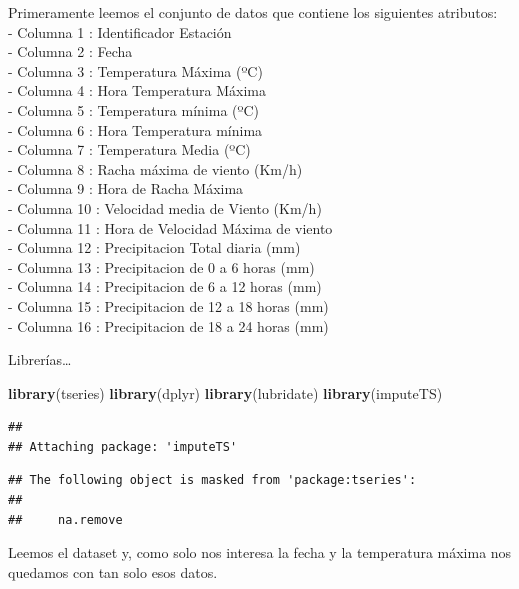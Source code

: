 \documentclass[]{article}
\newenvironment{Shaded}{\begin{snugshade}}{\end{snugshade}}
\newcommand{\KeywordTok}[1]{\textcolor[rgb]{0.13,0.29,0.53}{\textbf{#1}}}
\newcommand{\DataTypeTok}[1]{\textcolor[rgb]{0.13,0.29,0.53}{#1}}
\newcommand{\StringTok}[1]{\textcolor[rgb]{0.31,0.60,0.02}{#1}}
\newcommand{\OtherTok}[1]{\textcolor[rgb]{0.56,0.35,0.01}{#1}}
\newcommand{\OperatorTok}[1]{\textcolor[rgb]{0.81,0.36,0.00}{\textbf{#1}}}
\newcommand{\NormalTok}[1]{#1}
\begin{document}
Primeramente leemos el conjunto de datos que contiene los siguientes
atributos:\\
- Columna 1 : Identificador Estación\\
- Columna 2 : Fecha\\
- Columna 3 : Temperatura Máxima (ºC)\\
- Columna 4 : Hora Temperatura Máxima\\
- Columna 5 : Temperatura mínima (ºC)\\
- Columna 6 : Hora Temperatura mínima\\
- Columna 7 : Temperatura Media (ºC)\\
- Columna 8 : Racha máxima de viento (Km/h)\\
- Columna 9 : Hora de Racha Máxima\\
- Columna 10 : Velocidad media de Viento (Km/h)\\
- Columna 11 : Hora de Velocidad Máxima de viento\\
- Columna 12 : Precipitacion Total diaria (mm)\\
- Columna 13 : Precipitacion de 0 a 6 horas (mm)\\
- Columna 14 : Precipitacion de 6 a 12 horas (mm)\\
- Columna 15 : Precipitacion de 12 a 18 horas (mm)\\
- Columna 16 : Precipitacion de 18 a 24 horas (mm)

Librerías\ldots{}

\begin{Shaded}
\begin{Highlighting}[]
\KeywordTok{library}\NormalTok{(tseries)}
\KeywordTok{library}\NormalTok{(dplyr)}
\KeywordTok{library}\NormalTok{(lubridate)}
\KeywordTok{library}\NormalTok{(imputeTS)}
\end{Highlighting}
\end{Shaded}

\begin{verbatim}
## 
## Attaching package: 'imputeTS'
\end{verbatim}

\begin{verbatim}
## The following object is masked from 'package:tseries':
## 
##     na.remove
\end{verbatim}

Leemos el dataset y, como solo nos interesa la fecha y la temperatura
máxima nos quedamos con tan solo esos datos.

\begin{Shaded}
\end{Shaded}
\end{document}

